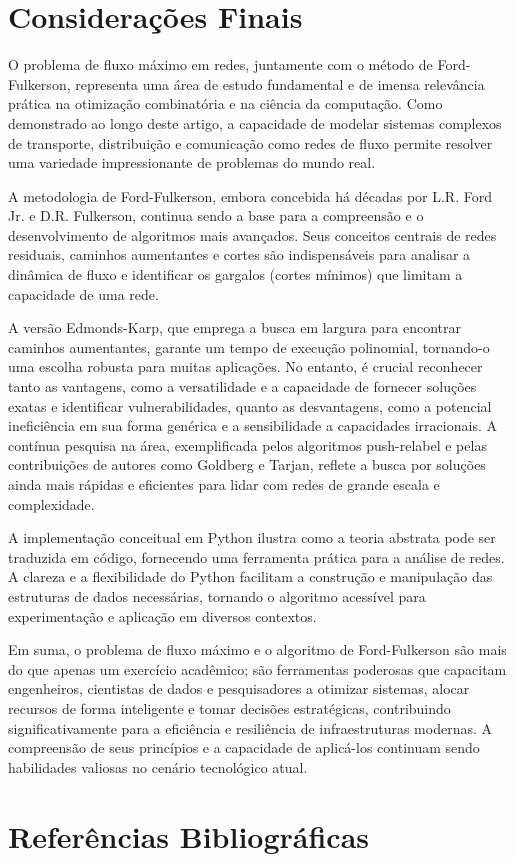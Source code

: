 \documentclass[12pt]{article}
\begin{document}
\newpage
\section{Considerações Finais}

O problema de fluxo máximo em redes, juntamente com o método de Ford-Fulkerson, representa uma área de estudo fundamental e de imensa relevância prática na otimização combinatória e na ciência da computação. Como demonstrado ao longo deste artigo, a capacidade de modelar sistemas complexos de transporte, distribuição e comunicação como redes de fluxo permite resolver uma variedade impressionante de problemas do mundo real.

\noindent A metodologia de Ford-Fulkerson, embora concebida há décadas por L.R. Ford Jr. e D.R. Fulkerson, continua sendo a base para a compreensão e o desenvolvimento de algoritmos mais avançados. Seus conceitos centrais de redes residuais, caminhos aumentantes e cortes são indispensáveis para analisar a dinâmica de fluxo e identificar os gargalos (cortes mínimos) que limitam a capacidade de uma rede. 

\noindent A versão Edmonds-Karp, que emprega a busca em largura para encontrar caminhos aumentantes, garante um tempo de execução polinomial, tornando-o uma escolha robusta para muitas aplicações.
No entanto, é crucial reconhecer tanto as vantagens, como a versatilidade e a capacidade de fornecer soluções exatas e identificar vulnerabilidades, quanto as desvantagens, como a potencial ineficiência em sua forma genérica e a sensibilidade a capacidades irracionais. A contínua pesquisa na área, exemplificada pelos algoritmos push-relabel e pelas contribuições de autores como Goldberg e Tarjan, reflete a busca por soluções ainda mais rápidas e eficientes para lidar com redes de grande escala e complexidade.

\noindent A implementação conceitual em Python ilustra como a teoria abstrata pode ser traduzida em código, fornecendo uma ferramenta prática para a análise de redes. A clareza e a flexibilidade do Python facilitam a construção e manipulação das estruturas de dados necessárias, tornando o algoritmo acessível para experimentação e aplicação em diversos contextos.

\noindent Em suma, o problema de fluxo máximo e o algoritmo de Ford-Fulkerson são mais do que apenas um exercício acadêmico; são ferramentas poderosas que capacitam engenheiros, cientistas de dados e pesquisadores a otimizar sistemas, alocar recursos de forma inteligente e tomar decisões estratégicas, contribuindo significativamente para a eficiência e resiliência de infraestruturas modernas. A compreensão de seus princípios e a capacidade de aplicá-los continuam sendo habilidades valiosas no cenário tecnológico atual.




\newpage
\section{Referências Bibliográficas}



\end{document}

